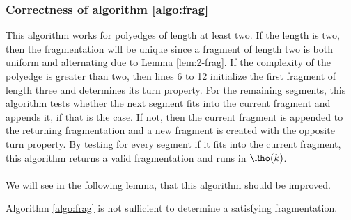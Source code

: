 \subsubsection{Correctness of algorithm \ref{algo:frag}}
This algorithm works for polyedges of length at least two. If the length is two, then the fragmentation will be unique since a fragment of length two is both uniform and alternating due to Lemma \ref{lem:2-frag}. If the complexity of the polyedge is greater than two, then lines 6 to 12 initialize the first fragment of length three and determines its turn property. For the remaining segments, this algorithm tests whether the next segment fits into the current fragment and appends it, if that is the case. If not, then the current fragment is appended to the returning fragmentation and a new fragment is created with the opposite turn property. By testing for every segment if it fits into the current fragment, this algorithm returns a valid fragmentation and runs in $\Rho(k)$.\\
\\We will see in the following lemma, that this algorithm should be improved.
\begin{lemma}
	Algorithm \ref{algo:frag} is not sufficient to determine a satisfying fragmentation.
\end{lemma}
